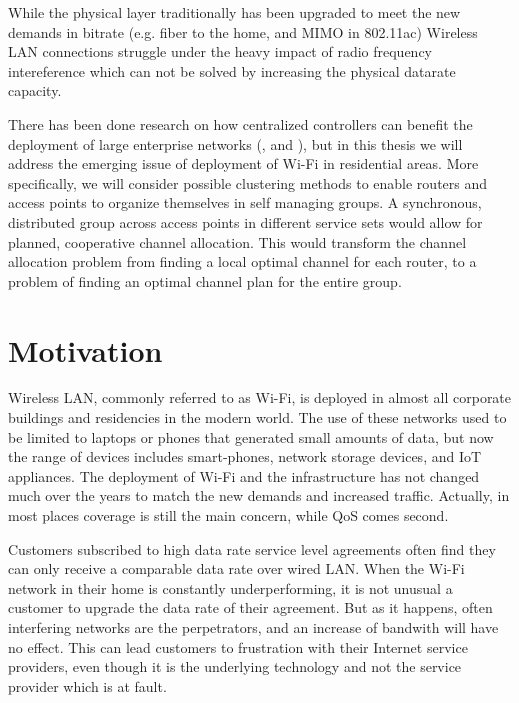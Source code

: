 While the physical layer traditionally has been upgraded to meet the new demands in bitrate (e.g. fiber to the home, 
and MIMO in 802.11ac) Wireless LAN connections struggle under the heavy impact of radio frequency intereference which can not be solved by increasing
the physical datarate capacity.

There has been done research on how centralized controllers can benefit the deployment of large enterprise networks (\cite{Murty}, \cite{Murty2} and \cite{Suresh}),
but in this thesis we will address the emerging issue of deployment of Wi-Fi in residential areas. More specifically, we will consider possible clustering methods
to enable routers and access points to organize themselves in self managing groups. A synchronous, distributed group across access points in different service sets
would allow for planned, cooperative channel allocation. This would transform the channel allocation problem from finding a local optimal channel for each router,
to a problem of finding an optimal channel plan for the entire group.

\section{Motivation}
Wireless LAN, commonly referred to as Wi-Fi, is deployed in almost all corporate buildings and residencies in the modern world.
The use of these networks used to be limited to laptops or phones that generated small amounts of data, but now the range of devices includes
smart-phones, network storage devices, and IoT appliances. The deployment of Wi-Fi and the infrastructure has not 
changed much over the years to match the new demands and increased traffic. Actually, in most places coverage is still the main concern, while
QoS comes second. 

Customers subscribed to high data rate service level agreements often find they can only receive a comparable data rate over wired LAN.
When the Wi-Fi network in their home is constantly underperforming, it is not unusual a customer to upgrade the data rate of their agreement.
But as it happens, often interfering networks are the perpetrators, and an increase of bandwith will have no effect.
This can lead customers to frustration with their Internet service providers, even though it is the underlying technology and not the service provider which is at fault.

